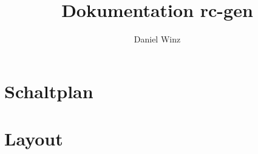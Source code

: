 \documentclass[a4paper,10pt,fleqn]{article}
\title{Dokumentation rc-gen}
\author{Daniel Winz}
\begin{document}
\maketitle
\clearpage
\tableofcontents
\clearpage

\section{Schaltplan}


\section{Layout}
\end{document}
